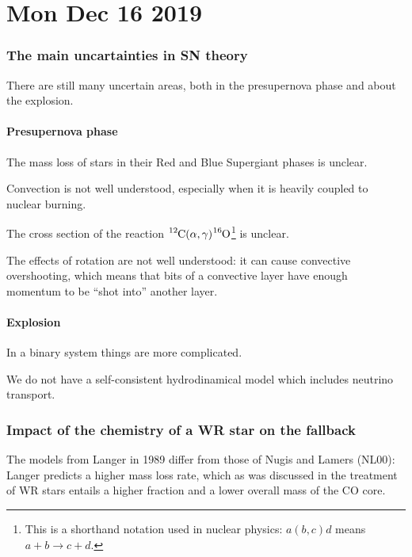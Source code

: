 \documentclass[main.tex]{subfiles}
\begin{document}
\section*{Mon Dec 16 2019}

\subsubsection{The main uncartainties in SN theory}

There are still many uncertain areas, both in the presupernova phase and about the explosion.

\paragraph{Presupernova phase}

The mass loss of stars in their Red and Blue Supergiant phases is unclear.

Convection is not well understood, especially when it is heavily coupled to nuclear burning. 

The cross section of the reaction \(\ce{^{12}C} (\alpha , \gamma ) \ce{^{16}O}\)\footnote{This is a shorthand notation used in nuclear physics: \(a(b,c)d\) means \(a + b \rightarrow c+d\).} is unclear.

The effects of rotation are not well understood: it can cause convective overshooting, which means that bits of a convective layer have enough momentum to be ``shot into'' another layer.

\paragraph{Explosion}

In a binary system things are more complicated. 

We do not have a self-consistent hydrodinamical model which includes neutrino transport.



\subsubsection{Impact of the chemistry of a WR star on the fallback}

The models from Langer in 1989 differ from those of Nugis and Lamers (NL00): Langer predicts a higher mass loss rate, which as was discussed in the treatment of WR stars entails a higher  fraction and a lower overall mass of the CO core.
\end{document}
